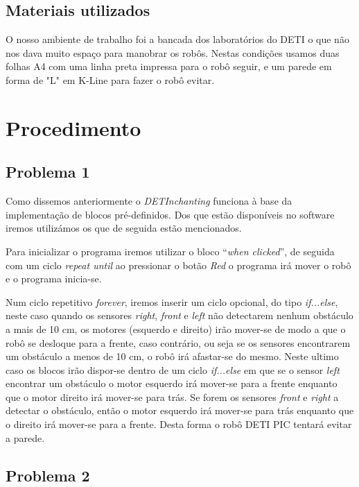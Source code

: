 \documentclass[a4paper, 12pt, onecolumn, oneside]{report}
\begin{document}
\subsection{Materiais utilizados}

O nosso ambiente de trabalho foi a bancada dos laboratórios do DETI o que não nos dava muito espaço para manobrar os robôs. Nestas condições usamos duas folhas A4 com uma linha preta impressa para o robô seguir, e um parede em forma de "L" em K-Line para fazer o robô evitar.






 \newpage
 
\section{Procedimento}

\subsection{Problema 1}

Como dissemos anteriormente o \emph{DETInchanting} funciona à base da implementação de blocos pré-definidos. Dos que estão disponíveis no software iremos utilizámos os que de seguida estão mencionados.

Para inicializar o programa iremos utilizar o bloco “\emph{when clicked}”, de seguida com um ciclo \emph{repeat 
until} ao pressionar o botão \emph{Red} o programa irá mover o robô e o programa inicia-se.

Num ciclo repetitivo \emph{forever}, iremos inserir um ciclo opcional, do tipo \emph{if...else}, neste caso quando os sensores \emph{right}, \emph{front} e \emph{left} não detectarem nenhum obstáculo a mais de 10 cm, os motores (esquerdo e direito) irão mover-se de modo a que o robô se desloque para a frente, caso contrário, ou seja se os sensores encontrarem um obstáculo a menos de 10 cm, o robô irá afastar-se do mesmo. Neste ultimo caso os blocos irão dispor-se dentro de um ciclo \emph{if...else} em que se o sensor \emph{left} encontrar um obstáculo o motor esquerdo irá mover-se para a frente enquanto que o motor direito irá mover-se para trás. Se forem os sensores \emph{front} e \emph{right} a detectar o obstáculo, então o motor esquerdo irá mover-se para trás enquanto que o direito irá mover-se para a frente. Desta forma o robô DETI PIC tentará evitar a parede.

\subsection{Problema 2}
\end{document}
